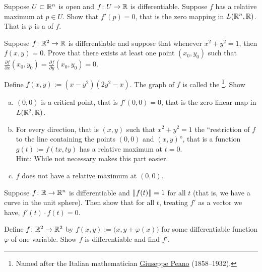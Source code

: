 \begin{exercise} \label{exercise:mv:maximumcritical}
Suppose $U \subset {\mathbb{R}}^n$ is open and
$f \colon U \to {\mathbb{R}}$ is differentiable.  Suppose $f$ has a relative maximum
at $p \in U$.  Show that $f'(p) = 0$, that is the zero mapping in
$L({\mathbb{R}}^n,{\mathbb{R}})$.  That is $p$ is a
\emph{} of $f$.
\end{exercise}

\begin{exercise}
Suppose $f \colon {\mathbb{R}}^2 \to {\mathbb{R}}$ is differentiable and suppose that
whenever $x^2+y^2 = 1$, then $f(x,y) = 0$.  Prove that there exists at least
one point $(x_0,y_0)$ such that
$\frac{\partial f}{\partial x}(x_0,y_0) = \frac{\partial f}{\partial
y}(x_0,y_0) = 0$.
\end{exercise}

\begin{exercise} \label{exercise:peano}
Define $f(x,y) := ( x-y^2 ) ( 2 y^2 - x)$.  The graph of $f$ is called
the \emph{}%
\footnote{Named after the Italian mathematician
\href{http://en.wikipedia.org/wiki/Giuseppe_Peano}{Giuseppe Peano}
(1858--1932).}.
Show
\begin{enumerate}[a)]
\item
$(0,0)$ is a critical point, that is $f'(0,0) = 0$, that is the zero
linear map in $L({\mathbb{R}}^2,{\mathbb{R}})$.
\item
For every direction, that is $(x,y)$ such that $x^2+y^2=1$ the
``restriction of $f$ to the line containing the points $(0,0)$ and
$(x,y)$'', that is a function $g(t) := f(tx,ty)$ has a relative maximum at
$t=0$.\\
Hint: While not necessary  makes
this part easier.
\item
$f$ does not have a relative maximum at $(0,0)$.
\end{enumerate}
\end{exercise}

\begin{exercise}
Suppose $f \colon {\mathbb{R}} \to {\mathbb{R}}^n$ is differentiable and $\lVert {f(t)} \rVert = 1$ for
all $t$ (that is, we have a curve in the unit sphere).  Then show that for
all $t$, treating $f'$ as a vector we have, $f'(t) \cdot f(t) = 0$.
\end{exercise}

\begin{exercise}
Define $f \colon {\mathbb{R}}^2 \to {\mathbb{R}}^2$ by $f(x,y) :=
\bigl(x,y+\varphi(x)\bigr)$ for some differentiable function $\varphi$ of one
variable.  Show $f$ is differentiable and find $f'$.
\end{exercise}


